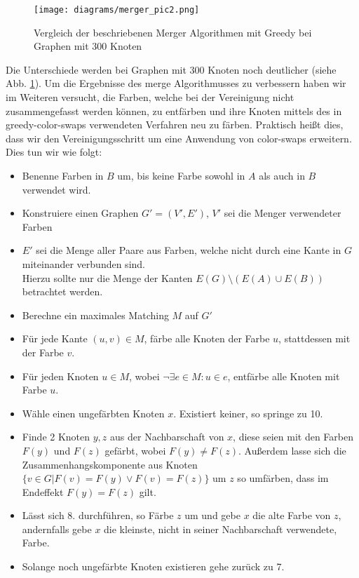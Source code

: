 \documentclass[11pt]{article}
\begin{document}
\begin{figure}
  \texttt{[image: diagrams/merger\_pic2.png]}
  \caption{Vergleich der beschriebenen Merger Algorithmen mit Greedy bei Graphen mit 300 Knoten}
  \label{fig:merge2}
\end{figure}

Die Unterschiede werden bei Graphen mit 300 Knoten noch deutlicher (siehe Abb. \ref{fig:merge2}).
Um die Ergebnisse des merge Algorithmusses zu verbessern haben wir im Weiteren versucht, 
die Farben, welche bei der Vereinigung nicht zusammengefasst werden können,
zu entfärben und ihre Knoten mittels des in greedy-color-swaps verwendeten Verfahren neu zu färben.
Praktisch heißt dies, dass wir den Vereinigungsschritt um eine Anwendung von color-swaps erweitern.
Dies tun wir wie folgt:

\begin{itemize}
\item[1.] Benenne Farben in $B$ um, bis keine Farbe sowohl in $A$ als auch in $B$ verwendet wird.
\item[2.] Konstruiere einen Graphen $G'=(V',E')$, $V'$ sei die Menger verwendeter Farben
\item[3.] $E'$ sei die Menge aller Paare aus Farben, welche nicht durch eine Kante in $G$ miteinander verbunden sind. \\Hierzu sollte nur die Menge der Kanten $E(G)\setminus (E(A)\cup E(B))$ betrachtet werden.
\item[4.] Berechne ein maximales Matching $M$ auf $G'$
\item[5.] Für jede Kante $(u,v)\in M$, färbe alle Knoten der Farbe $u$, stattdessen mit der Farbe $v$.
\item[6.] Für jeden Knoten $u\in M$, wobei $\neg \exists e\in M : u\in e$, entfärbe alle Knoten mit Farbe $u$.
\item[7.] Wähle einen ungefärbten Knoten $x$. Existiert keiner, so springe zu 10.
\item[8.] Finde 2 Knoten $y,z$ aus der Nachbarschaft von $x$, diese seien mit den Farben $F(y)$ und $F(z)$ gefärbt, wobei $F(y)\neq F(z)$.
Außerdem lasse sich die Zusammenhangskomponente aus Knoten $\{v\in G | F(v)=F(y) \lor F(v)=F(z)\}$ um $z$ so umfärben, dass im Endeffekt $F(y)=F(z)$ gilt.
\item[9.] Lässt sich 8. durchführen, so Färbe $z$ um und gebe $x$ die alte Farbe von $z$, andernfalls gebe $x$ die kleinste, nicht in seiner Nachbarschaft verwendete, Farbe.
\item[10.] Solange noch ungefärbte Knoten existieren gehe zurück zu 7.
\end{itemize}
\end{document}

